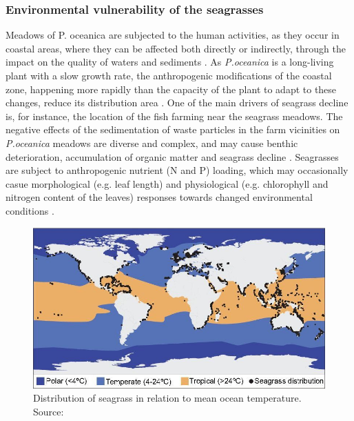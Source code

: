 \documentclass[10pt, a4paper]{article}
\begin{document}
\subsubsection{Environmental vulnerability of the seagrasses}
Meadows of P. oceanica are subjected to the human activities, as they occur in coastal areas, where
they can be affected both directly \cite{Meinesz91}\label{Meinesz91} or indirectly, through the impact on the
quality of waters and sediments \cite{Duarte02}\label{Duarte02}. As \textit{P.oceanica} is a long-living plant with a slow
growth rate, the anthropogenic modifications of the coastal zone, happening more rapidly than the
capacity of the plant to adapt to these changes, reduce its distribution area \cite{Micheli05}\label{Micheli05}. One
of the main drivers of seagrass decline is, for instance, the location of the fish farming near the
seagrass meadows. The negative effects of the sedimentation of waste particles in the farm vicinities
on \textit{P.oceanica} meadows are diverse and complex, and may cause benthic deterioration, accumulation
of organic matter and seagrass decline \cite{Holmer08}\label{Holmer08}. Seagrasses are subject to anthropogenic
nutrient (N and P) loading, which may occasionally casue morphological (e.g. leaf length) and
physiological (e.g. chlorophyll and nitrogen content of the leaves) responses towards changed
environmental conditions \cite{Leoni06,Leoni07}\label{Leoni06} \label{Leoni07}. 

\begin{figure}
	\centering
	\includegraphics[scale=0.20]{Fig-1-4.jpg}
	\caption{Distribution of seagrass in relation to mean ocean temperature. \\
	Source: \cite{Orth06}\label{Orth06}}
	\label{Fig.4}
\end{figure}
\end{document}
